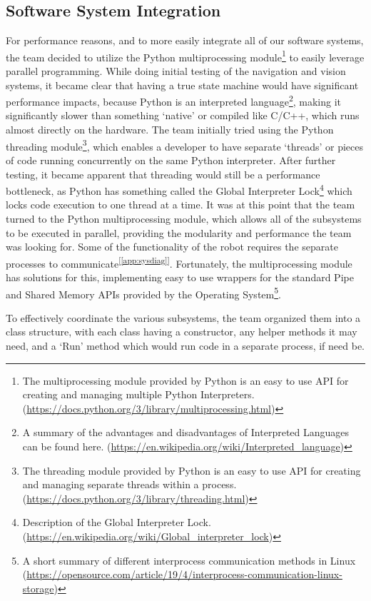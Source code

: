 \documentclass[11pt, twoside]{report}
\newcommand{\refapp}[1]{\textsuperscript{[\ref{#1}]}}
\begin{document}
\subsection{Software System Integration}
For performance reasons, and to more easily integrate all of our software systems, the team decided to utilize the Python multiprocessing module\footnote{The multiprocessing module provided by Python is an easy to use API for creating and managing multiple Python Interpreters. (\url{https://docs.python.org/3/library/multiprocessing.html})} to easily leverage parallel programming. While doing initial testing of the navigation and vision systems, it became clear that having a true state machine would have significant performance impacts, because Python is an interpreted language\footnote{A summary of the advantages and disadvantages of Interpreted Languages can be found here. (\url{https://en.wikipedia.org/wiki/Interpreted\_language})}, making it significantly slower than something ‘native’ or compiled like C/C++, which runs almost directly on the hardware. The team initially tried using the Python threading module\footnote{The threading module provided by Python is an easy to use API for creating and managing separate threads within a process. (\url{https://docs.python.org/3/library/threading.html})}, which enables a developer to have separate ‘threads’ or pieces of code running concurrently on the same Python interpreter. After further testing, it became apparent that threading would still be a performance bottleneck, as Python has something called the Global Interpreter Lock\footnote{Description of the Global Interpreter Lock. (\url{https://en.wikipedia.org/wiki/Global\_interpreter\_lock})} which locks code execution to one thread at a time. It was at this point that the team turned to the Python multiprocessing module, which allows all of the subsystems to be executed in parallel, providing the modularity and performance the team was looking for. Some of the functionality of the robot requires the separate processes to communicate\refapp{app:sysdiag}. Fortunately, the multiprocessing module has solutions for this, implementing easy to use wrappers for the standard Pipe and Shared Memory APIs provided by the Operating System\footnote{A short summary of different interprocess communication methods in Linux (\url{https://opensource.com/article/19/4/interprocess-communication-linux-storage})}.

To effectively coordinate the various subsystems, the team organized them into a class structure, with each class having a constructor, any helper methods it may need, and a ‘Run’ method which would run code in a separate process, if need be. 
\end{document}
